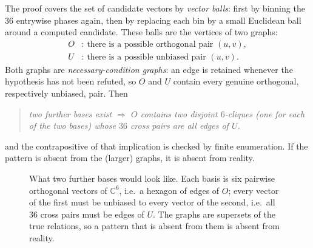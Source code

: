 \documentclass[11pt]{article}
\theoremstyle{definition}
\theoremstyle{plain}
\theoremstyle{definition}
\newcommand{\C}{\mathbb{C}}
\newenvironment{claim}{\begin{quote}\itshape}{\end{quote}}
\begin{document}
The proof covers the set of candidate vectors by \emph{vector balls}: first by binning the $36$
entrywise phases again, then by replacing each bin by a small Euclidean ball around a computed
candidate. These balls are the vertices of two graphs:
\[
\begin{aligned}
O&:\ \text{there is a possible orthogonal pair }(u,v),\\
U&:\ \text{there is a possible unbiased pair }(u,v).
\end{aligned}
\]
Both graphs are \emph{necessary-condition graphs}: an edge is retained whenever the hypothesis has not
been refuted, so $O$ and $U$ contain every genuine orthogonal, respectively unbiased, pair. Then
\begin{claim}
two further bases exist $\Longrightarrow$ $O$ contains two disjoint $6$-cliques (one for each of the
two bases) whose $36$ cross pairs are all edges of $U$.
\end{claim}
and the contrapositive of that implication is checked by finite enumeration. If the pattern is absent
from the (larger) graphs, it is absent from reality.

\begin{figure}[t]
\centering
{}
\caption{What two further bases would look like. Each basis is six pairwise orthogonal vectors of
$\C^6$, i.e.\ a hexagon of edges of $O$; every vector of the first must be unbiased to every vector of
the second, i.e.\ all $36$ cross pairs must be edges of $U$. The graphs are supersets of the true
relations, so a pattern that is absent from them is absent from reality.}
\label{fig:cliques}
\end{figure}
\end{document}
